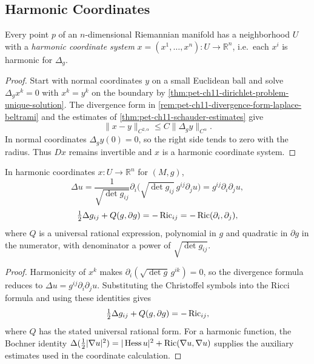 \subsection{Harmonic Coordinates}

\begin{lemma}
  \label{lem:pet-ch11-harmonic-coordinates-exist}
  Every point $p$ of an $n$-dimensional Riemannian manifold has a neighborhood
  $U$ with a \emph{harmonic coordinate system}
  $x=(x^1,\dots,x^n):U\to\mathbb{R}^n$, i.e.\ each $x^i$ is harmonic for
  $\Delta_g$.
\end{lemma}
\begin{proof}
  \sketch
  Start with normal coordinates \(y\) on a small Euclidean ball and solve
  \(\Delta_gx^k=0\) with \(x^k=y^k\) on the boundary by
  \cref{thm:pet-ch11-dirichlet-problem-unique-solution}. The divergence form
  in \cref{rem:pet-ch11-divergence-form-laplace-beltrami} and the estimates
  of \cref{thm:pet-ch11-schauder-estimates} give
  \[
    \|x-y\|_{C^{2,\alpha}}\le C\|\Delta_gy\|_{C^\alpha}.
  \]
  In normal coordinates \(\Delta_gy(0)=0\), so the right side tends to zero with the radius. Thus \(Dx\) remains invertible and \(x\) is a harmonic coordinate system.
\end{proof}


\begin{lemma}
  \label{lem:pet-ch11-laplacian-ricci-harmonic-coords}
  In harmonic coordinates $x:U\to\mathbb{R}^n$ for $(M,g)$,
  \begin{equation}
    \Delta u=\frac1{\sqrt{\det g_{ij}}}\partial_i\big(\sqrt{\det g_{ij}}\,g^{ij}\partial_ju\big)=g^{ij}\partial_i\partial_ju,
  \end{equation}
  \begin{equation}
    \tfrac12\Delta g_{ij}+Q(g,\partial g)=-\operatorname{Ric}_{ij}=-\operatorname{Ric}(\partial_i,\partial_j),
  \end{equation}
  where $Q$ is a universal rational expression, polynomial in $g$ and
  quadratic in $\partial g$ in the numerator, with denominator a power of
  $\sqrt{\det g_{ij}}$.
\end{lemma}
\begin{proof}
  \sketch
  Harmonicity of \(x^k\) makes
  \(\partial_i(\sqrt{\det g}\,g^{ik})=0\), so the divergence formula reduces to
  \(\Delta u=g^{ij}\partial_i\partial_ju\). Substituting the Christoffel symbols into the Ricci formula and using these identities gives
  \[
    \tfrac12\Delta g_{ij}+Q(g,\partial g)=-\operatorname{Ric}_{ij},
  \]
  where \(Q\) has the stated universal rational form. For a harmonic function, the Bochner identity
  \(\Delta(\tfrac12|\nabla u|^2)=|\operatorname{Hess} u|^2+\operatorname{Ric}(\nabla u,\nabla u)\)
  supplies the auxiliary estimates used in the coordinate calculation.
\end{proof}


